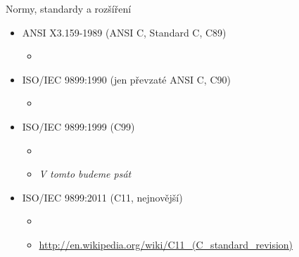 \begin{frame}{Normy, standardy a rozšíření}

  \begin{itemize}
    \item ANSI X3.159-1989 (ANSI C, Standard C, C89)
    \begin{itemize}
      \item {}
    \end{itemize}

    \item ISO/IEC 9899:1990 (jen převzaté ANSI C, C90)
    \begin{itemize}
      \item {}
    \end{itemize}

    \pause

    \item ISO/IEC 9899:1999 (C99)
    \begin{itemize}
      \item {}
      \item \emph{V tomto budeme psát}
    \end{itemize}

    \pause

    \item ISO/IEC 9899:2011 (C11, nejnovější)
    \begin{itemize}
      \item {}
      \item \url{http://en.wikipedia.org/wiki/C11_(C_standard_revision)}
    \end{itemize}

  \end{itemize}

\end{frame}

